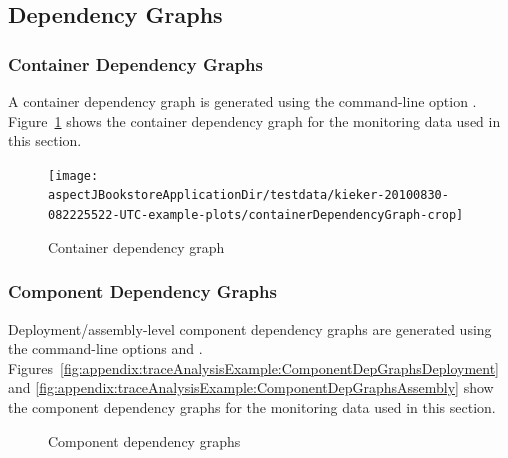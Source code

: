 \pagebreak

\subsection{Dependency Graphs}

\subsubsection{Container Dependency Graphs}

A container dependency graph is generated using the command-line option %
\OPT{\OPTplotContainerDependencyGraph}. %
Figure~\ref{fig:appendix:traceAnalysisExample:ContainerDepGraph} shows the %
container dependency graph for the monitoring data used in this section. 

\begin{figure}[h]\centering
\texttt{[image: \\aspectJBookstoreApplicationDir/testdata/kieker-20100830-082225522-UTC-example-plots/containerDependencyGraph-crop]}
\caption{Container dependency graph}
\label{fig:appendix:traceAnalysisExample:ContainerDepGraph}
\end{figure}

\subsubsection{Component Dependency Graphs}

Deployment/assembly-level component dependency graphs are generated using the %
command-line options \OPT{\OPTplotDeploymentComponentDependencyGraph} and %
\OPT{\OPTplotAssemblyComponentDependencyGraph}. %
Figures~\ref{fig:appendix:traceAnalysisExample:ComponentDepGraphsDeployment} and %
\ref{fig:appendix:traceAnalysisExample:ComponentDepGraphsAssembly} show the %
component dependency graphs for the monitoring data used in this section. 

\begin{figure}[h]\centering
{}
\caption{Component dependency graphs}
\label{fig:appendix:traceAnalysisExample:ComponentDepGraphs}
\end{figure}

